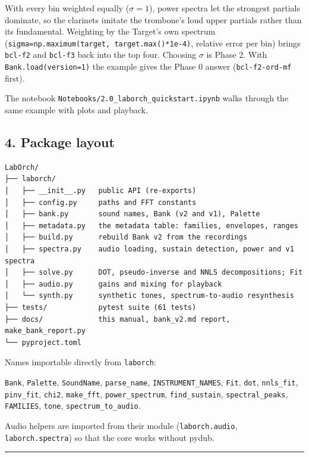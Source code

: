 \documentclass[
  10pt,
]{article}
\begin{document}
With every bin weighted equally ($\sigma = 1$), power spectra let
the strongest partials dominate, so the clarinets imitate
the trombone's loud upper partials rather than its
fundamental. Weighting by the Target's own spectrum
(\texttt{sigma=np.maximum(target,\ target.max()*1e-4)},
relative error per bin) brings \texttt{bcl-f2} and
\texttt{bcl-f3} back into the top four. Choosing $\sigma$ is Phase
2. With \texttt{Bank.load(version=1)} the example gives the
Phase 0 answer (\texttt{bcl-f2-ord-mf} first).

The notebook
\texttt{Notebooks/2.0\_laborch\_quickstart.ipynb} walks
through the same example with plots and playback.

\subsection{4. Package layout}

\begin{verbatim}
LabOrch/
├── laborch/
│   ├── __init__.py   public API (re-exports)
│   ├── config.py     paths and FFT constants
│   ├── bank.py       sound names, Bank (v2 and v1), Palette
│   ├── metadata.py   the metadata table: families, envelopes, ranges
│   ├── build.py      rebuild Bank v2 from the recordings
│   ├── spectra.py    audio loading, sustain detection, power and v1 spectra
│   ├── solve.py      DOT, pseudo-inverse and NNLS decompositions; Fit
│   ├── audio.py      gains and mixing for playback
│   └── synth.py      synthetic tones, spectrum-to-audio resynthesis
├── tests/            pytest suite (61 tests)
├── docs/             this manual, bank_v2.md report, make_bank_report.py
└── pyproject.toml
\end{verbatim}

Names importable directly from \texttt{laborch}:

\texttt{Bank}, \texttt{Palette}, \texttt{SoundName},
\texttt{parse\_name}, \texttt{INSTRUMENT\_NAMES},
\texttt{Fit}, \texttt{dot}, \texttt{nnls\_fit},
\texttt{pinv\_fit}, \texttt{chi2}, \texttt{make\_fft},
\texttt{power\_spectrum}, \texttt{find\_sustain},
\texttt{spectral\_peaks}, \texttt{FAMILIES}, \texttt{tone},
\texttt{spectrum\_to\_audio}.

Audio helpers are imported from their module
(\texttt{laborch.audio}, \texttt{laborch.spectra}) so that
the core works without pydub.

\begin{center}\rule{0.5\linewidth}{0.5pt}\end{center}
\end{document}
